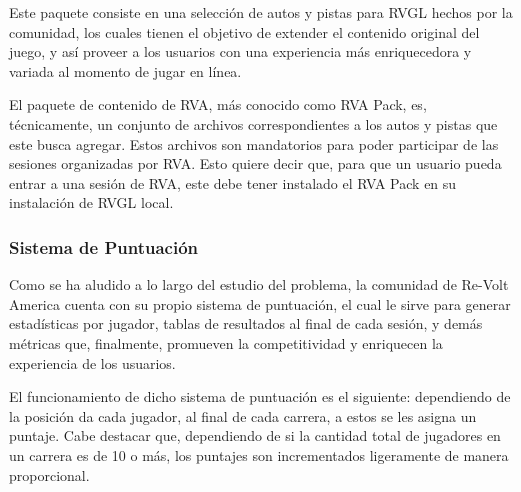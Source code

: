 Este paquete consiste en una selección de autos y pistas para RVGL hechos por la comunidad, los cuales tienen el objetivo de extender el contenido original del juego, y así proveer a los usuarios con una experiencia más enriquecedora y variada al momento de jugar en línea.

El paquete de contenido de RVA, más conocido como RVA Pack, es, técnicamente, un conjunto de archivos correspondientes a los autos y pistas que este busca agregar. Estos archivos son mandatorios para poder participar de las sesiones organizadas por RVA. Esto quiere decir que, para que un usuario pueda entrar a una sesión de RVA, este debe tener instalado el RVA Pack en su instalación de RVGL local.

\subsubsection{Sistema de Puntuación}
Como se ha aludido a lo largo del estudio del problema, la comunidad de Re-Volt America cuenta con su propio sistema de puntuación, el cual le sirve para generar estadísticas por jugador, tablas de resultados al final de cada sesión, y demás métricas que, finalmente, promueven la competitividad y enriquecen la experiencia de los usuarios.

El funcionamiento de dicho sistema de puntuación es el siguiente: dependiendo de la posición da cada jugador, al final de cada carrera, a estos se les asigna un puntaje. Cabe destacar que, dependiendo de si la cantidad total de jugadores en un carrera es de 10 o más, los puntajes son incrementados ligeramente de manera proporcional.

